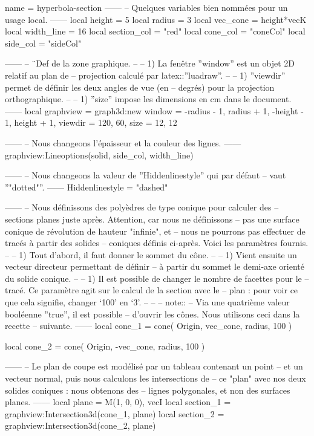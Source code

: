 \documentclass{standalone}
\begin{document}
\begin{luadraw}{name = hyperbola-section}
------
-- Quelques variables bien nommées pour un usage local.
------
local height      =  5
local radius      =  3
local vec_cone    = height*vecK
local width_line  =  16
local section_col = "red"
local cone_col    = "coneCol"
local side_col    = "sideCol"

------
-- ¨Def de la zone graphique.
--
--     1) La fenêtre ''window'' est un objet 2D relatif au plan de
--     projection calculé par latex::''luadraw''.
--
--     1) ''viewdir'' permet de définir les deux angles de vue (en
--     degrés) pour la projection orthographique.
--
--     1) ''size'' impose les dimensions en cm dans le document.
------
local graphview = graph3d:new{
  window  = {-radius - 1, radius + 1, -height - 1, height + 1},
  viewdir = {120, 60},
  size    = {12, 12}
}

------
-- Nous changeons l'épaisseur et la couleur des lignes.
------
graphview:Lineoptions(solid, side_col, width_line)

------
-- Nous changeons la valeur de ''Hiddenlinestyle'' qui par défaut
-- vaut ''"dotted"''.
------
Hiddenlinestyle = "dashed"

------
-- Nous définissons des polyèdres de type conique pour calculer des
-- sections planes juste après. Attention, car nous ne définissons
-- pas une surface conique de révolution de hauteur "infinie", et
-- nous ne pourrons pas effectuer de tracés à partir des solides
-- coniques définis ci-après. Voici les paramètres fournis.
--
--     1) Tout d'abord, il faut donner le sommet du cône.
--
--     1) Vient ensuite un vecteur directeur permettant de définir
--     à partir du sommet le demi-axe orienté du solide conique.
--
--     1) Il est possible de changer le nombre de facettes pour le
--     tracé. Ce paramètre agit sur le calcul de la section avec le
--     plan : pour voir ce que cela signifie, changer `100' en `3'.
--
--
-- note::
--     Via une quatrième valeur booléenne ''true'', il est possible
--     d'ouvrir les cônes. Nous utilisons ceci dans la recette
--     suivante.
------
local cone_1 = cone(
  Origin, vec_cone, radius,
  100
)

local cone_2 = cone(
  Origin,  -vec_cone, radius,
  100
)

------
-- Le plan de coupe est modélisé par un tableau contenant un point
-- et un vecteur normal, puis nous calculons les intersections de
-- ce "plan" avec nos deux solides coniques : nous obtenons des
-- lignes polygonales, et non des surfaces planes.
------
local plane     = {M(1, 0, 0), vecI}
local section_1 = graphview:Intersection3d(cone_1, plane)
local section_2 = graphview:Intersection3d(cone_2, plane)


\end{luadraw}
\end{document}
